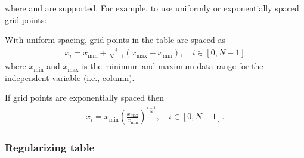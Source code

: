 \documentclass[letterpaper,10pt,english]{sphinxmanual}
\begin{document}
where  and  are supported.
For example, to use uniformly or exponentially spaced grid points:

\begin{sphinxVerbatim}[commandchars=\\\{\},formatcom=\scriptsize]
 

     
 
\end{sphinxVerbatim}


With uniform spacing, grid points in the table are spaced as
\begin{equation*}
\begin{split}x_i = x_{\textrm{min}} + \frac{i}{N-1}\left(x_{\textrm{max}} - x_{\textrm{min}}\right),\quad i\in[0,N-1]\end{split}
\end{equation*}
where \(x_{\textrm{min}}\) and \(x_{\textrm{max}}\) is the minimum and maximum data range for the independent variable (i.e., column).


If grid points are exponentially spaced then
\begin{equation*}
\begin{split}x_i = x_{\textrm{min}}\left(\frac{x_{\textrm{max}}}{x_{\textrm{min}}}\right)^{\frac{i-1}{N}}, \quad i\in[0,N-1].\end{split}
\end{equation*}

\subsubsection{Regularizing table}
\label{\detokenize{Utilities/LookupTable:regularizing-table}}
\begin{sphinxVerbatim}[commandchars=\\\{\},formatcom=\scriptsize]
   
\end{sphinxVerbatim}
\end{document}
